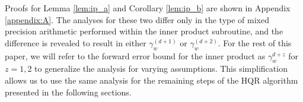 Proofs for Lemma \ref{lem:ip_a} and Corollary \ref{lem:ip_b} are shown in Appendix \ref{appendix:A}.
The analyses for these two differ only in the type of mixed precision arithmetic performed within the inner product subroutine, and the difference is revealed to result in either $\gamma_w^{(d+1)}$ or $\gamma_w^{(d+2)}$.
For the rest of this paper, we will refer to the forward error bound for the inner product as $\gamma_w^{d+z}$ for $z=1,2$ to generalize the analysis for varying assumptions.
This simplification allows us to use the same analysis for the remaining steps of the HQR algorithm presented in the following sections.